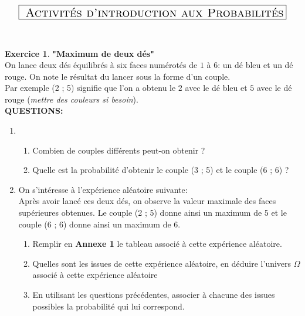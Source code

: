\documentclass[a4paper,11pt]{article}
\theoremstyle{definition}
\newtheorem{exo}{Exercice}
\begin{document}
	
\chead{}\renewcommand{\headrulewidth}{0.4pt}\renewcommand{\footrulewidth}{0.4pt}

\hfill\\[-0.7cm]
$$	\fbox{\text{\Large{ \sc Activités d'introduction aux Probabilités}}}$$

\hfill\\[-0.5cm]

\begin{exo}\textbf{"Maximum de deux dés"}\hfill\\[0.25cm]
	On lance deux dés équilibrés à six faces numérotés de $1$ à $6$: un dé bleu et un dé rouge. On note le résultat du lancer sous la forme d'un couple.\\
	 Par exemple (2 ; 5) signifie que l'on a obtenu le $2$ avec le dé bleu et $5$ avec le dé rouge (\textit{mettre des couleurs si besoin}).\\[0.5cm]
	\textbf{QUESTIONS:}
	
	\begin{enumerate}
		\item 
		\begin{enumerate}
			\item Combien de couples différents peut-on obtenir ? 
			\item Quelle est la probabilité d'obtenir le couple (3 ; 5) et le couple (6 ; 6) ?
		\end{enumerate}
		\item On s'intéresse à l'expérience aléatoire suivante:\\[0.25cm]
		Après avoir lancé ces deux dés, on observe la valeur maximale des faces supérieures obtenues. Le couple (2 ; 5) donne ainsi un maximum de 5 et le couple (6 ; 6) donne ainsi un maximum de 6. \\[-0.25cm]
		\begin{enumerate}
			\item  Remplir en \textbf{Annexe 1} le tableau associé à cette expérience aléatoire. 
			\item Quelles sont les issues de cette expérience aléatoire, en déduire l'univers \large{$\Omega$} \normalsize associé à cette expérience aléatoire
			\item En utilisant les questions précédentes, associer à chacune des issues possibles la probabilité qui lui correspond. 
		\end{enumerate}
		
	\end{enumerate}
\bigskip	  
\end{exo}
\end{document}
